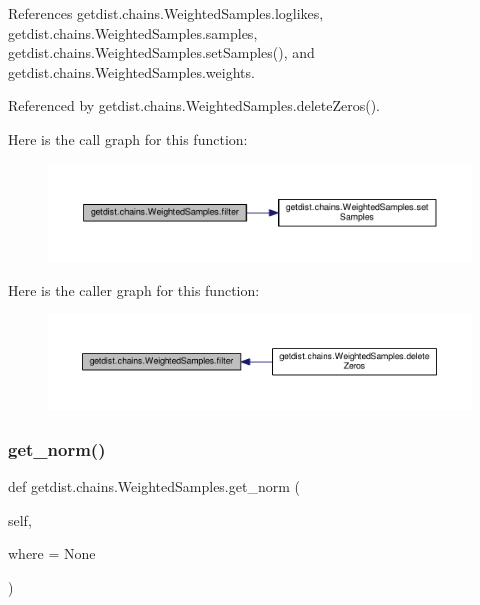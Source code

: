 References getdist.\+chains.\+Weighted\+Samples.\+loglikes, getdist.\+chains.\+Weighted\+Samples.\+samples, getdist.\+chains.\+Weighted\+Samples.\+set\+Samples(), and getdist.\+chains.\+Weighted\+Samples.\+weights.



Referenced by getdist.\+chains.\+Weighted\+Samples.\+delete\+Zeros().

Here is the call graph for this function\+:
\nopagebreak
\begin{figure}[H]
\begin{center}
\leavevmode
\includegraphics[width=350pt]{classgetdist_1_1chains_1_1WeightedSamples_a2b75dc00ef960c6d4769476c6125d50f_cgraph}
\end{center}
\end{figure}
Here is the caller graph for this function\+:
\nopagebreak
\begin{figure}[H]
\begin{center}
\leavevmode
\includegraphics[width=350pt]{classgetdist_1_1chains_1_1WeightedSamples_a2b75dc00ef960c6d4769476c6125d50f_icgraph}
\end{center}
\end{figure}
\mbox{\label{classgetdist_1_1chains_1_1WeightedSamples_adb6da75221743f7a05286cbb2b2685b0}} 
\subsubsection{\texorpdfstring{get\+\_\+norm()}{get\_norm()}}
{\footnotesize\ttfamily def getdist.\+chains.\+Weighted\+Samples.\+get\+\_\+norm (\begin{DoxyParamCaption}\item[{}]{self,  }\item[{}]{where = {\ttfamily None} }\end{DoxyParamCaption})}

